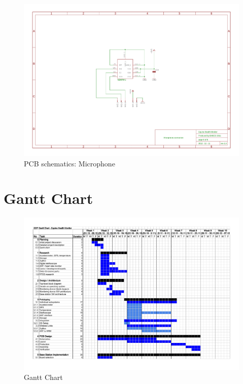 \begin{figure}[htb]
\centering
\includegraphics[width=\columnwidth]{Images/pcb_mic}
\caption{PCB schematics: Microphone}
\label{fig:pcb_schematics_5}
\end{figure}






\clearpage
\section{Gantt Chart}
\label{sec:gantt_chart}
\begin{figure}[htb]
\centering
\includegraphics[angle=90, width=0.9\columnwidth]{Data/gantt_chart}
\caption{Gantt Chart}
\label{fig:gantt_chart}
\end{figure}

\clearpage

